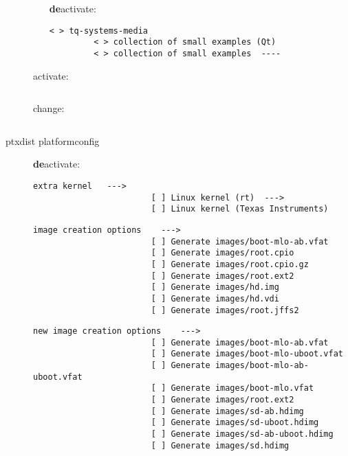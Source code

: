 \begin{description}
		\begin{itemize} \textbf{de}activate:
		        \begin{lstlisting}[caption={}]
		 < > tq-systems-media
		 < > collection of small examples (Qt)
		 < > collection of small examples  ----
				\end{lstlisting}
		\end{itemize}

		\begin{itemize} activate:
		        \begin{lstlisting}[caption={}]
				\end{lstlisting}
		\end{itemize}

		\begin{itemize} change:
		        \begin{lstlisting}[caption={}]

				\end{lstlisting}
		\end{itemize}


	\item[ptxdist platformconfig]

		\begin{itemize} \textbf{de}activate:
		        \begin{lstlisting}[caption={extra kernel imges to generate}]
                    extra kernel   --->
                        [ ] Linux kernel (rt)  --->
                        [ ] Linux kernel (Texas Instruments)
				\end{lstlisting}

		        \begin{lstlisting}[caption={Images NOT to create #1}]
                    image creation options    --->
                        [ ] Generate images/boot-mlo-ab.vfat
                        [ ] Generate images/root.cpio
                        [ ] Generate images/root.cpio.gz
                        [ ] Generate images/root.ext2
                        [ ] Generate images/hd.img
                        [ ] Generate images/hd.vdi
                        [ ] Generate images/root.jffs2
				\end{lstlisting}


		        \begin{lstlisting}[caption={Images NOT to create #2}]
                    new image creation options    --->
                        [ ] Generate images/boot-mlo-ab.vfat
                        [ ] Generate images/boot-mlo-uboot.vfat
                        [ ] Generate images/boot-mlo-ab-uboot.vfat
                        [ ] Generate images/boot-mlo.vfat
                        [ ] Generate images/root.ext2
                        [ ] Generate images/sd-ab.hdimg
                        [ ] Generate images/sd-uboot.hdimg
                        [ ] Generate images/sd-ab-uboot.hdimg
                        [ ] Generate images/sd.hdimg
				\end{lstlisting}



\end{itemize}
\end{description}
